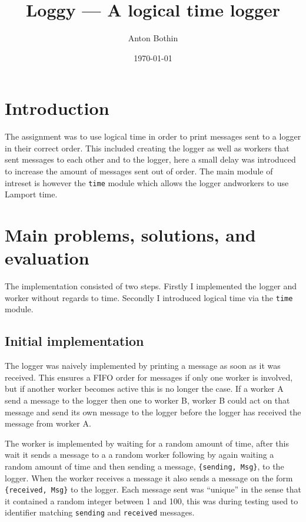 \documentclass[a4paper, 11pt]{article}
\title{Loggy --- A logical time logger}
\author{Anton Bothin}
\date{\today{}}
\begin{document}
\maketitle

\section{Introduction}

The assignment was to use logical time in order to print messages sent to a logger in their correct order. This included creating the logger as well as workers that sent messages to each other and to the logger, here a small delay was introduced to increase the amount of messages sent out of order. The main module of intreset is however the \texttt{time} module which allows the logger andworkers to use Lamport time.

\section{Main problems, solutions, and evaluation}

The implementation consisted of two steps. Firstly I implemented the logger and worker without regards to time. Secondly I introduced logical time via the \texttt{time} module.

\subsection{Initial implementation}

The logger was naively implemented by printing a message as soon as it was received. This ensures a FIFO order for messages if only one worker is involved, but if another worker becomes active this is no longer the case. If a worker A send a message to the logger then one to worker B, worker B could act on that message and send its own message to the logger before the logger has received the message from worker A.

The worker is implemented by waiting for a random amount of time, after this wait it sends a message to a a random worker following by again waiting a random amount of time and then sending a message, \texttt{\{sending, Msg\}}, to the logger. When the worker receives a message it also sends a message on the form \texttt{\{received, Msg\}} to the logger. Each message sent was ``unique'' in the sense that it contained a random integer between 1 and 100, this was during testing used to identifier matching \texttt{sending} and \texttt{received} messages.
\end{document}
